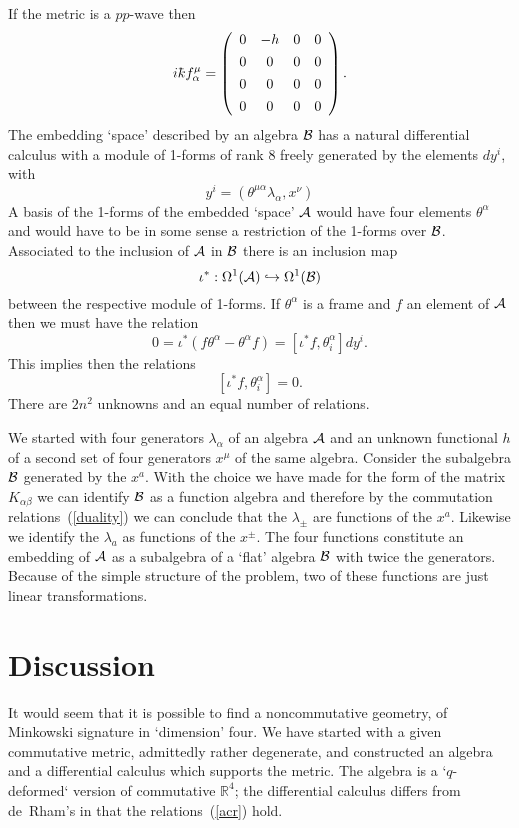 \documentclass[12pt,a4paper]{article}
\newcounter{eg}
\def\b#1{{\mathbb #1}}
\def\c#1{{\cal #1}}
\def\kbar{{\mathchar'26\mkern-9muk}}
\newcommand{\initiate}{\setcounter{equation}{0}}
\begin{document}
If the metric is a $pp$-wave then
$$
i\kbar f^\mu_\alpha = \left(\begin{array}{cccc} 
0 &-h &0 &0 \\[4pt] 0 &0 &0 &0 \\[4pt] 
0 &0 &0 &0 \\[4pt] 0 &0 &0 &0 \end{array}\right).
$$
The embedding `space' described by an algebra $\c{B}$ has a natural
differential calculus with a module of 1-forms of rank 8 freely
generated by the elements $dy^i$, with
$$
y^i = (\theta^{\mu\alpha}\lambda_\alpha, x^\nu)
$$
A basis of the 1-forms of the embedded `space' $\c{A}$ would have
four elements $\theta^\alpha$ and would have to be in some sense a
restriction of the 1-forms over $\c{B}$. Associated to the inclusion
of $\c{A}$ in $\c{B}$ there is an inclusion map
$$
\iota^* : \Omega^1(\c{A}) \hookrightarrow \Omega^1(\c{B})
$$
between the respective module of 1-forms. If $\theta^\alpha$ is a
frame and $f$ an element of $\c{A}$ then we must have the relation
$$
0 = \iota^* (f\theta^\alpha - \theta^\alpha f) =
[\iota^* f, \theta^\alpha_i] dy^i.
$$
This implies then the relations 
$$
[\iota^* f, \theta^\alpha_i] = 0.
$$
There are $2n^2$ unknowns and an equal number of relations.

We started with four generators $\lambda_\alpha$ of an algebra $\c{A}$
and an unknown functional $h$ of a second set of four generators
$x^\mu$ of the same algebra. Consider the subalgebra $\c{B}$ generated
by the $x^a$. With the choice we have made for the form of the matrix
$K_{\alpha\beta}$ we can identify $\c{B}$ as a function algebra and
therefore by the commutation relations~(\ref{duality}) we
can conclude that the $\lambda_\pm$ are functions of the
$x^a$. Likewise we identify the $\lambda_a$ as functions of the
$x^\pm$. The four functions constitute an embedding of $\c{A}$ as a
subalgebra of a `flat' algebra $\c{B}$ with twice the
generators. Because of the simple structure of the problem, two of
these functions are just linear transformations.



\initiate
\section{Discussion}

It would seem that it is possible to find a noncommutative geometry,
of Minkowski signature in `dimension' four. We have
started with a given commutative metric, admittedly rather degenerate,
and constructed an algebra and a differential calculus which supports
the metric. The algebra is a `$q$-deformed` version of commutative
$\b{R}^4$; the differential calculus differs from de~Rham's in that the
relations~(\ref{acr}) hold.
\end{document}
